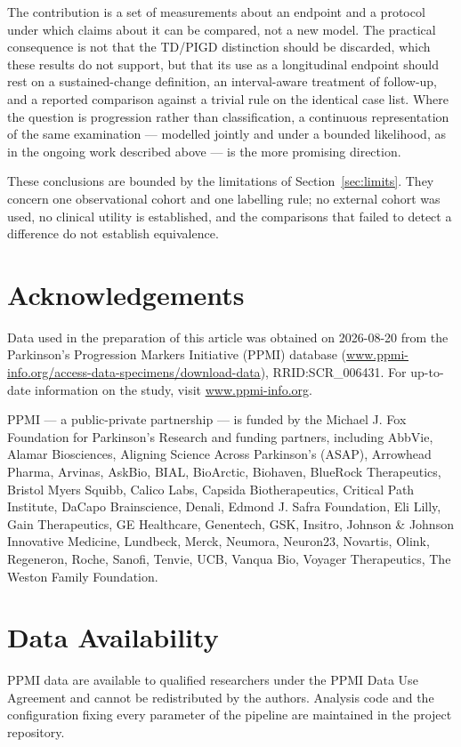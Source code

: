 \documentclass[11pt]{article}
\begin{document}
The contribution is a set of measurements about an endpoint and a protocol under
which claims about it can be compared, not a new model. The practical consequence
is not that the TD/PIGD distinction should be discarded, which these results do
not support, but that its use as a longitudinal endpoint should rest on a
sustained-change definition, an interval-aware treatment of follow-up, and a
reported comparison against a trivial rule on the identical case list. Where the
question is progression rather than classification, a continuous representation of
the same examination --- modelled jointly and under a bounded likelihood, as in
the ongoing work described above --- is the more promising direction.

These conclusions are bounded by the limitations of Section~\ref{sec:limits}. They
concern one observational cohort and one labelling rule; no external cohort was
used, no clinical utility is established, and the comparisons that failed to
detect a difference do not establish equivalence.

\section*{Acknowledgements}

Data used in the preparation of this article was obtained on 2026-08-20 from the
Parkinson's Progression Markers Initiative (PPMI) database
(\url{www.ppmi-info.org/access-data-specimens/download-data}),
RRID:SCR\_006431. For up-to-date information on the study, visit
\url{www.ppmi-info.org}.

PPMI --- a public-private partnership --- is funded by the Michael J. Fox
Foundation for Parkinson's Research and funding partners, including AbbVie,
Alamar Biosciences, Aligning Science Across Parkinson's (ASAP), Arrowhead
Pharma, Arvinas, AskBio, BIAL, BioArctic, Biohaven, BlueRock Therapeutics,
Bristol Myers Squibb, Calico Labs, Capsida Biotherapeutics, Critical Path
Institute, DaCapo Brainscience, Denali, Edmond J. Safra Foundation, Eli Lilly,
Gain Therapeutics, GE Healthcare, Genentech, GSK, Insitro, Johnson \& Johnson
Innovative Medicine, Lundbeck, Merck, Neumora, Neuron23, Novartis, Olink,
Regeneron, Roche, Sanofi, Tenvie, UCB, Vanqua Bio, Voyager Therapeutics, The
Weston Family Foundation.

\section*{Data Availability}
PPMI data are available to qualified researchers under the PPMI Data Use
Agreement and cannot be redistributed by the authors. Analysis code and the
configuration fixing every parameter of the pipeline are maintained in the
project repository.




\clearpage

\end{document}
